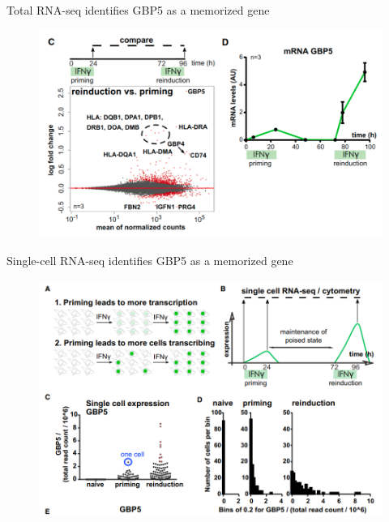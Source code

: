 \documentclass[aspectratio=1610]{beamer}					%
\begin{document}
\begin{frame}{Total RNA-seq identifies GBP5 as a memorized gene}
\begin{figure}
\includegraphics[width=13cm]{figure-2.png}
\end{figure}

\end{frame}

\begin{frame}{Single-cell RNA-seq identifies GBP5 as a memorized gene}
\begin{figure}
\includegraphics[width=12cm]{figure-3.png}
\end{figure}

\end{frame}
\end{document}
